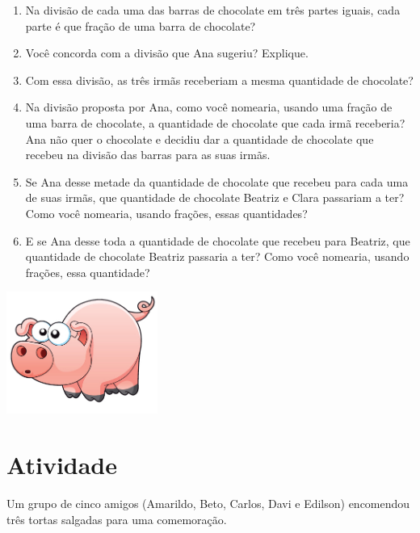 \documentclass[a4,12pt]{book}
\begin{document}
\begin{enumerate} [\quad a)] %
  \item     Na divisão de cada uma das barras de chocolate em três partes iguais, cada parte é que fração de uma barra de chocolate?
  \item     Você concorda com a divisão que Ana sugeriu? Explique.
  \item     Com essa divisão, as três irmãs receberiam a mesma quantidade de chocolate?
  \item     Na divisão proposta por Ana, como você nomearia, usando uma fração de uma barra de chocolate, a quantidade de chocolate que cada irmã receberia? Ana não quer o chocolate e decidiu dar a quantidade de chocolate que recebeu na divisão das barras para as suas irmãs.
  \item     Se Ana desse metade da quantidade de chocolate que recebeu para cada uma de suas irmãs, que quantidade de chocolate Beatriz e Clara passariam a ter? Como você nomearia, usando frações, essas quantidades?
  \item     E se Ana desse toda a quantidade de chocolate que recebeu para Beatriz, que quantidade de chocolate  Beatriz passaria a ter? Como você nomearia, usando frações, essa quantidade?
\end{enumerate} %









\includegraphics[width=\textwidth,height=4cm, keepaspectratio]{pig}
\section{Atividade}







Um grupo de cinco amigos (Amarildo, Beto, Carlos, Davi e Edilson) encomendou três tortas salgadas para uma comemoração.
\end{document}
